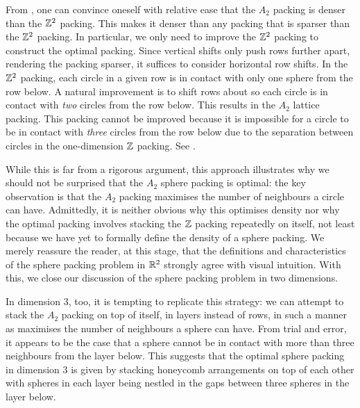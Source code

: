 From , one can convince oneself with relative ease that the $A_2$ packing is denser than the $\mathbb{Z}^2$ packing. This makes it denser than any packing that is sparser than the $\mathbb{Z}^2$ packing. In particular, we only need to improve the $\mathbb{Z}^2$ packing to construct the optimal packing. Since vertical shifts only push rows further apart, rendering the packing sparser, it suffices to consider horizontal row shifts. In the $\mathbb{Z}^2$ packing, each circle in a given row is in contact with only one sphere from the row below. A natural improvement is to shift rows about so each circle is in contact with \textit{two} circles from the row below. This results in the $A_2$ lattice packing. This packing cannot be improved because it is impossible for a circle to be in contact with \textit{three} circles from the row below due to the separation between circles in the one-dimension $\mathbb{Z}$ packing. See .

While this is far from a rigorous argument, this approach illustrates why we should not be surprised that the $A_2$ sphere packing is optimal: the key observation is that the $A_2$ packing maximises the number of neighbours a circle can have. Admittedly, it is neither obvious why this optimises density nor why the optimal packing involves stacking the $\mathbb{Z}$ packing repeatedly on itself, not least because we have yet to formally define the density of a sphere packing. We merely reassure the reader, at this stage, that the definitions and characteristics of the sphere packing problem in $\mathbb{R}^2$ strongly agree with visual intuition. With this, we close our discussion of the sphere packing problem in two dimensions.

In dimension $3$, too, it is tempting to replicate this strategy: we can attempt to stack the $A_2$ packing on top of itself, in layers instead of rows, in such a manner as maximises the number of neighbours a sphere can have. From trial and error, it appears to be the case that a sphere cannot be in contact with more than three neighbours from the layer below. This suggests that the optimal sphere packing in dimension $3$ is given by stacking honeycomb arrangements on top of each other with spheres in each layer being nestled in the gaps between three spheres in the layer below.

